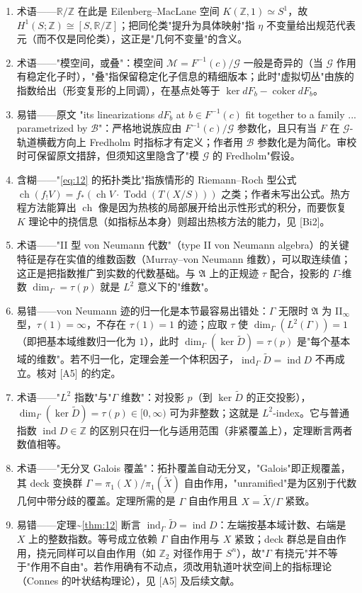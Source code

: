\documentclass[11pt]{amsart}
\theoremstyle{definition}
\theoremstyle{remark}
\theoremstyle{plain}
\numberwithin{equation}{section}
\renewcommand{\:}{\colon}
\newcommand{\RR}{{\mathbb R}}
\newcommand{\ZZ}{{\mathbb Z}}
\DeclareMathOperator{\ch}{ch}
\DeclareMathOperator{\coker}{coker}
\DeclareMathOperator{\ind}{ind}
\newcommand{\inv}{^{-1}}
\DeclareMathOperator{\Todd}{Todd}
\newcommand{\RZ}{\RR/\ZZ}
\newcommand{\sB}{\mathscr{B}}
\newcommand{\sG}{\mathscr{G}}
\newcommand{\sM}{\mathscr{M}}
\newcommand{\ssA}{\mathfrak{A}}
\newcommand{\tD}{\widetilde{D}}
\newcommand{\tX}{\widetilde{X}}
\begin{document}
\begin{enumerate}[leftmargin=2.2em,itemsep=2pt,topsep=2pt]
  \item 术语——$\RZ$ 在此是 Eilenberg–MacLane 空间 $K(\ZZ,1)\simeq S^1$，故 $H^1(S;\ZZ)\cong[S,\RZ]$；把同伦类"提升为具体映射"指 $\eta$ 不变量给出规范代表元（而不仅是同伦类），这正是"几何不变量"的含义。
  \item 术语——"模空间，或叠"：模空间 $\sM=F\inv (c)/\sG$ 一般是奇异的（当 $\sG$ 作用有稳定化子时），"叠"指保留稳定化子信息的精细版本；此时"虚拟切丛"由族的指数给出（形变复形的上同调），在基点处等于 $\ker dF_b-\coker dF_b$。
  \item 易错——原文 "its linearizations $dF_b$ at $b\in F\inv (c)$ fit together to a family ... parametrized by $\sB$"：严格地说族应由 $F\inv (c)/\sG$ 参数化，且只有当 $F$ 在 $\sG$-轨道横截方向上 Fredholm 时指标才有定义；作者用 $\sB$ 参数化是为简化。审校时可保留原文措辞，但须知这里隐含了"模 $\sG$ 的 Fredholm"假设。
  \item 含糊——"\eqref{eq:12} 的拓扑类比"指族情形的 Riemann–Roch 型公式 $\ch(f_!V)=f_*(\ch V\cdot \Todd(T(X/S)))$ 之类；作者未写出公式。热方程方法能算出 $\ch$ 像是因为热核的局部展开给出示性形式的积分，而要恢复 $K$ 理论中的挠信息（如指标丛本身）则超出热核方法的能力，见 [Bi2]。
  \item 术语——"II 型 von Neumann 代数"（type II von Neumann algebra）的关键特征是存在实值的维数函数（Murray–von Neumann 维数），可以取连续值；这正是把指数推广到实数的代数基础。与 $\ssA$ 上的正规迹 $\tau$ 配合，投影的 $\Gamma$-维数 $\dim_\Gamma=\tau(p)$ 就是 $L^2$ 意义下的"维数"。
  \item 易错——von Neumann 迹的归一化是本节最容易出错处：$\Gamma$ 无限时 $\ssA$ 为 II$_\infty$ 型，$\tau(1)=\infty$，不存在 $\tau(1)=1$ 的迹；应取 $\tau$ 使 $\dim_\Gamma(L^2(\Gamma))=1$（即把基本域维数归一化为 $1$），此时 $\dim_\Gamma(\ker\tD)=\tau(p)$ 是"每个基本域的维数"。若不归一化，定理会差一个体积因子，$\ind_\Gamma\tD=\ind D$ 不再成立。核对 [A5] 的约定。
  \item 术语——"$L^2$ 指数"与"$\Gamma$ 维数"：对投影 $p$（到 $\ker\tD$ 的正交投影），$\dim_\Gamma(\ker\tD)=\tau(p)\in[0,\infty)$ 可为非整数；这就是 $L^2$-index。它与普通指数 $\ind D\in\ZZ$ 的区别只在归一化与适用范围（非紧覆盖上），定理断言两者数值相等。
  \item 术语——"无分叉 Galois 覆盖"：拓扑覆盖自动无分叉，"Galois"即正规覆盖，其 deck 变换群 $\Gamma=\pi_1(X)/\pi_1(\tX)$ 自由作用，"unramified"是为区别于代数几何中带分歧的覆盖。定理所需的是 $\Gamma$ 自由作用且 $X=\tX/\Gamma$ 紧致。
  \item 易错——定理\textasciitilde{}\ref{thm:12} 断言 $\ind_\Gamma\tD=\ind D$：左端按基本域计数、右端是 $X$ 上的整数指数。等号成立依赖 $\Gamma$ 自由作用与 $X$ 紧致；deck 群总是自由作用，挠元同样可以自由作用（如 $\ZZ_2$ 对径作用于 $S^n$），故"$\Gamma$ 有挠元"并不等于"作用不自由"。若作用确有不动点，须改用轨道叶状空间上的指标理论（Connes 的叶状结构理论），见 [A5] 及后续文献。
\end{enumerate}
\end{document}
